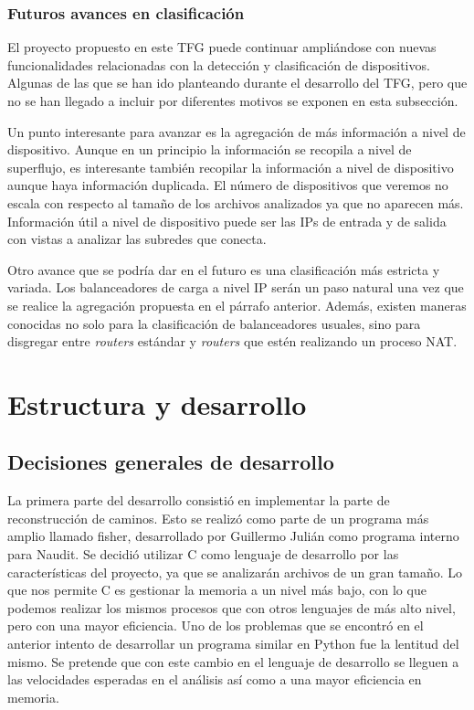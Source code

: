 \documentclass[twoside, 12pt]{epstfg}
\begin{document}
\subsection{Futuros avances en clasificación}
\label{subsec:Analisis:Dispositivos:Futuro}
El proyecto propuesto en este TFG puede continuar ampliándose con nuevas funcionalidades relacionadas con la detección y clasificación de dispositivos. Algunas de las que se han ido planteando durante el desarrollo del TFG, pero que no se han llegado a incluir por diferentes motivos se exponen en esta subsección.

Un punto interesante para avanzar es la agregación de más información a nivel de dispositivo. Aunque en un principio la información se recopila a nivel de superflujo, es interesante también recopilar la información a nivel de dispositivo aunque haya información duplicada. El número de dispositivos que veremos no escala con respecto al tamaño de los archivos analizados ya que no aparecen más. Información útil a nivel de dispositivo puede ser las IPs de entrada y de salida con vistas a analizar las subredes que conecta.

Otro avance que se podría dar en el futuro es una clasificación más estricta y variada. Los balanceadores de carga a nivel IP serán un paso natural una vez que se realice la agregación propuesta en el párrafo anterior. Además, existen maneras conocidas no solo para la clasificación de balanceadores usuales, sino para disgregar entre \textit{routers} estándar y \textit{routers} que estén realizando un proceso NAT.

\chapter{Estructura y desarrollo}
\label{chap:Desarrollo}
\section{Decisiones generales de desarrollo}

La primera parte del desarrollo consistió en implementar la parte de reconstrucción de caminos. Esto se realizó como parte de un programa más amplio llamado fisher, desarrollado por Guillermo Julián como programa interno para Naudit. Se decidió utilizar C como lenguaje de desarrollo por las características del proyecto, ya que se analizarán archivos de un gran tamaño. Lo que nos permite C es gestionar la memoria a un nivel más bajo, con lo que podemos realizar los mismos procesos que con otros lenguajes de más alto nivel, pero con una mayor eficiencia. Uno de los problemas que se encontró en el anterior intento de desarrollar un programa similar en Python fue la lentitud del mismo. Se pretende que con este cambio en el lenguaje de desarrollo se lleguen a las velocidades esperadas en el análisis así como a una mayor eficiencia en memoria.
\end{document}
